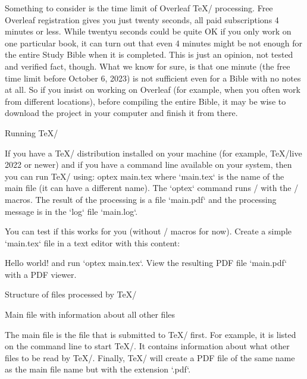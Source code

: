 \recommended
Something to consider is the time limit of Overleaf \TeX/ processing. 
Free Overleaf registration gives you just twenty seconds, all paid  subscriptions 4 
minutes or less. 
While twentyu seconds could be quite OK if you only work on one particular book, 
it can turn out that even 4 minutes might be not enough for the entire Study Bible 
when it is completed. 
This is just an opinion, not tested and verified fact, though. 
What we know for sure, is that one minute (the free time limit before October 6, 2023) 
is not sufficient even for a Bible with no notes at all.
So if you insist on working on Overleaf 
(for example, when you often  work from different locations), 
before compiling the entire Bible, it may be wise to download the project in your 
computer and finish it from there.






\sec Running \TeX/

If you have a \TeX/ distribution installed on your machine (for example, \TeX/live
2022 or newer) %
and if you have a command line available on your system, then you can run \TeX/ using:
\begtt
optex main.tex
\endtt
where `main.tex` is the name of the main file (it can have a different name). 
The `optex` command runs \LuaTeX/ with the \OpTeX/ macros. The result of the processing is a file 
`main.pdf` and the processing message is in the `log` file `main.log`.

You can test if this works for you (without \OpBible/ macros for now). Create a simple `main.tex` 
file in a text editor with this content:

\begtt
\fontfam[lm]
Hello world!
\bye
\endtt
and run `optex main.tex`. View the resulting PDF file `main.pdf` with a PDF viewer.


\sec Structure of files processed by \TeX/

\secc[main] Main file with information about all other files

The main file is the file that is submitted to \TeX/ first. For example, it is
listed on the command line to start \TeX/. It contains information about what
other files to be read by \TeX/. Finally, \TeX/ will create a PDF file of the same
name as the main file name but with the extension `.pdf`.

